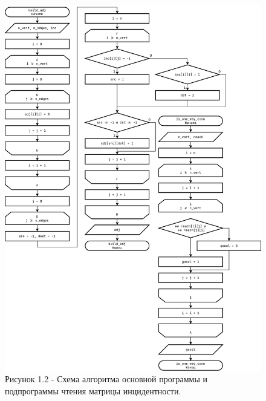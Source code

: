 \documentclass[oneside,a4paper,14pt]{extarticle}
\begin{document}
\clearpage
\begin{figure}[H]
	\centering
	\includegraphics[height=0.9\textheight]{pics/flowchart2.png}
	\caption*{Рисунок 1.2 - Схема алгоритма основной программы и подпрограммы чтения матрицы инцидентности.}
\end{figure}
\end{document}
